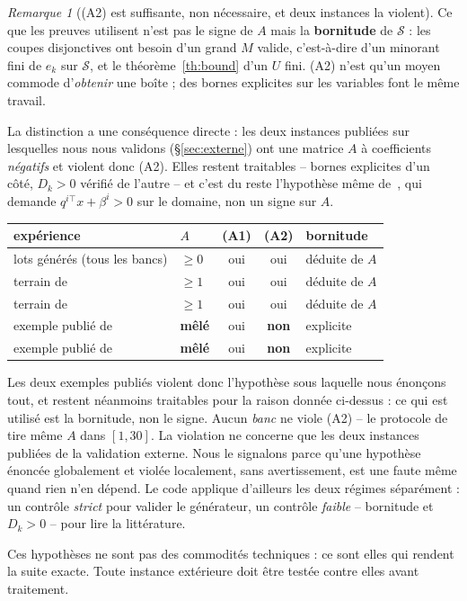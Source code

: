 \documentclass[11pt,a4paper]{article}
\theoremstyle{plain}
\theoremstyle{remark}
\newtheorem{remark}{Remarque}
\newcommand{\Dk}{D_k}
\newcommand{\Scal}{\mathcal{S}}
\begin{document}
\begin{remark}[(A2) est suffisante, non nécessaire, et deux instances la
violent]\label{rem:a2}
Ce que les preuves utilisent n'est pas le signe de $A$ mais la
\textbf{bornitude} de $\Scal$ : les coupes disjonctives ont besoin d'un
grand $M$ valide, c'est-à-dire d'un minorant fini de $e_k$ sur $\Scal$, et
le théorème~\ref{th:bound} d'un $U$ fini. (A2) n'est qu'un moyen commode
d'\emph{obtenir} une boîte ; des bornes explicites sur les variables font
le même travail.

La distinction a une conséquence directe : les deux instances publiées sur
lesquelles nous nous validons (§\ref{sec:externe}) ont une matrice $A$ à
coefficients \emph{négatifs} et violent donc (A2). Elles restent
traitables -- bornes explicites d'un côté, $\Dk>0$ vérifié de l'autre --
et c'est du reste l'hypothèse même de~\cite{zerdani2011}, qui demande
$q^{i\top}x+\beta^i>0$ sur le domaine, non un signe sur $A$.

\begin{center}
\begin{tabular}{llccl}
\toprule
expérience & $A$ & (A1) & (A2) & bornitude\\
\midrule
lots générés (tous les bancs) & $\ge 0$ & oui & oui & déduite de $A$\\
terrain de~\cite{zerdani2011} & $\ge 1$ & oui & oui & déduite de $A$\\
terrain de~\cite{drici2018} & $\ge 1$ & oui & oui & déduite de $A$\\
\midrule
exemple publié de~\cite{zerdani2011} & \textbf{mêlé} & oui
 & \textbf{non} & explicite\\
exemple publié de~\cite{drici2018} & \textbf{mêlé} & oui
 & \textbf{non} & explicite\\
\bottomrule
\end{tabular}
\end{center}

\noindent
Les deux exemples publiés violent donc l'hypothèse sous laquelle nous
énonçons tout, et restent néanmoins traitables pour la raison donnée
ci-dessus : ce qui est utilisé est la bornitude, non le signe.
Aucun \emph{banc} ne viole (A2) -- le protocole de~\cite{drici2018} tire
même $A$ dans $[1,30]$. La violation ne concerne que les deux instances
publiées de la validation externe. Nous le signalons parce qu'une hypothèse
énoncée globalement et violée localement, sans avertissement, est une faute
même quand rien n'en dépend. Le code applique d'ailleurs les deux régimes
séparément : un contrôle \emph{strict} pour valider le générateur, un
contrôle \emph{faible} -- bornitude et $\Dk>0$ -- pour lire la littérature.
\end{remark}
Ces hypothèses ne sont pas des commodités techniques : ce sont elles qui
rendent la suite exacte. Toute instance extérieure doit être testée contre
elles avant traitement.
\end{document}
